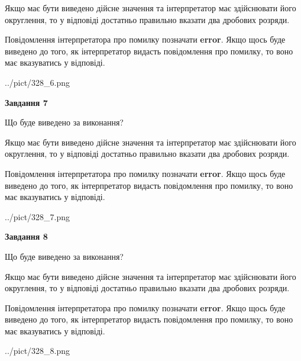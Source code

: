 \documentclass[12pt, ukrainian]{article}
\begin{document}
{\begin {Large}
Якщо має бути виведено дійсне значення та інтерпретатор має здійснювати його округлення, 
то у відповіді достатньо правильно вказати два дробових розряди.

Повідомлення інтерпретатора про помилку позначати \textbf{error}.
Якщо щось буде виведено до того, як інтерпретатор видасть повідомлення про помилку, 
то воно має вказуватись у відповіді. \par

\begin{center}
	{../pict/328_6.png}
\end{center}
\newpage

{\begin {center}\textbf{Завдання 7}\end {center}}\par
Що буде виведено за виконання? \par

Якщо має бути виведено дійсне значення та інтерпретатор має здійснювати його округлення, 
то у відповіді достатньо правильно вказати два дробових розряди.

Повідомлення інтерпретатора про помилку позначати \textbf{error}.
Якщо щось буде виведено до того, як інтерпретатор видасть повідомлення про помилку, 
то воно має вказуватись у відповіді. \par

\begin{center}
	{../pict/328_7.png}
\end{center}
\newpage

{\begin {center}\textbf{Завдання 8}\end {center}}\par
Що буде виведено за виконання? \par

Якщо має бути виведено дійсне значення та інтерпретатор має здійснювати його округлення, 
то у відповіді достатньо правильно вказати два дробових розряди.

Повідомлення інтерпретатора про помилку позначати \textbf{error}.
Якщо щось буде виведено до того, як інтерпретатор видасть повідомлення про помилку, 
то воно має вказуватись у відповіді. \par

\begin{center}
	{../pict/328_8.png}
\end{center}
\newpage


\end{Large}}
\end{document}
